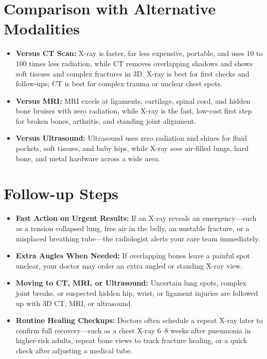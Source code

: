 \section{Comparison with Alternative Modalities}

\begin{itemize}
    \item \textbf{Versus CT Scan:} X-ray is faster, far less expensive, portable, and uses 10 to 100 times less radiation, while CT removes overlapping shadows and shows soft tissues and complex fractures in 3D. X-ray is best for first checks and follow-ups; CT is best for complex trauma or unclear chest spots.
    \item \textbf{Versus MRI:} MRI excels at ligaments, cartilage, spinal cord, and hidden bone bruises with zero radiation, while X-ray is the fast, low-cost first step for broken bones, arthritis, and standing joint alignment.
    \item \textbf{Versus Ultrasound:} Ultrasound uses zero radiation and shines for fluid pockets, soft tissues, and baby hips, while X-ray sees air-filled lungs, hard bone, and metal hardware across a wide area.
\end{itemize}

\section{Follow-up Steps}

\begin{itemize}
    \item \textbf{Fast Action on Urgent Results:} If an X-ray reveals an emergency---such as a tension collapsed lung, free air in the belly, an unstable fracture, or a misplaced breathing tube---the radiologist alerts your care team immediately.
    \item \textbf{Extra Angles When Needed:} If overlapping bones leave a painful spot unclear, your doctor may order an extra angled or standing X-ray view.
    \item \textbf{Moving to CT, MRI, or Ultrasound:} Uncertain lung spots, complex joint breaks, or suspected hidden hip, wrist, or ligament injuries are followed up with 3D CT, MRI, or ultrasound.
    \item \textbf{Routine Healing Checkups:} Doctors often schedule a repeat X-ray later to confirm full recovery---such as a chest X-ray 6--8 weeks after pneumonia in higher-risk adults, repeat bone views to track fracture healing, or a quick check after adjusting a medical tube.
\end{itemize}

